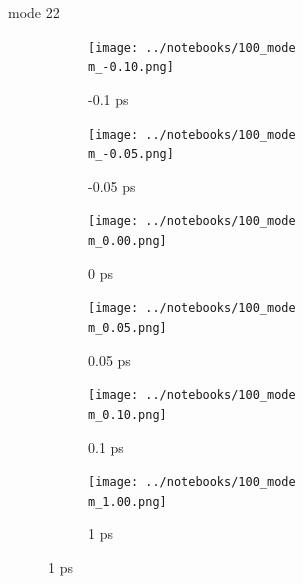\documentclass{beamer}
\newcommand\w{0.32}
\begin{document}
\renewcommand\m{22}
\begin{frame}{mode \m}
	\begin{figure}
		\centering
		\begin{subfigure}[b]{\w\textwidth}
			\centering
			\texttt{[image: ../notebooks/100\_mode\\m\_-0.10.png]}
			\caption{-0.1 ps}
		\end{subfigure}
		\begin{subfigure}[b]{\w\textwidth}
			\centering
			\texttt{[image: ../notebooks/100\_mode\\m\_-0.05.png]}
			\caption{-0.05 ps}
		\end{subfigure}
		\begin{subfigure}[b]{\w\textwidth}
			\centering
			\texttt{[image: ../notebooks/100\_mode\\m\_0.00.png]}
			\caption{0 ps}
		\end{subfigure}
		\begin{subfigure}[b]{\w\textwidth}
			\centering
			\texttt{[image: ../notebooks/100\_mode\\m\_0.05.png]}
			\caption{0.05 ps}
		\end{subfigure}
		\begin{subfigure}[b]{\w\textwidth}
			\centering
			\texttt{[image: ../notebooks/100\_mode\\m\_0.10.png]}
			\caption{0.1 ps}
		\end{subfigure}
		\begin{subfigure}[b]{\w\textwidth}
			\centering
			\texttt{[image: ../notebooks/100\_mode\\m\_1.00.png]}
			\caption{1 ps}
		\end{subfigure}
	\end{figure}
\end{frame}
\end{document}
